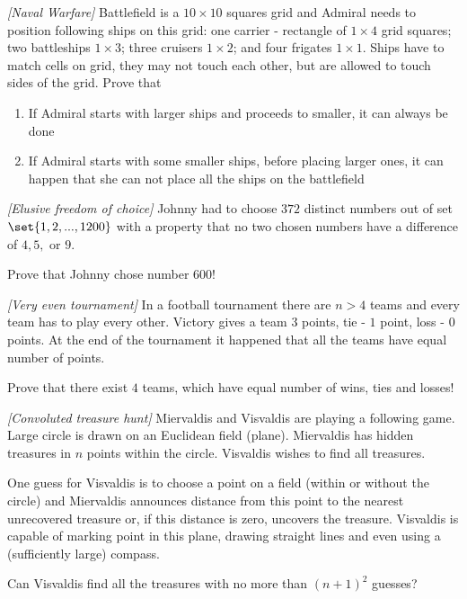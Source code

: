 



\renewcommand{\theenumi}{\alph{enumi}}



\noindent 

\begin{problem}
\textit{[Naval Warfare]}
Battlefield is a $10 \times 10$ squares grid and Admiral needs to position following ships on this grid: one carrier - rectangle of $1 \times 4$ grid squares; two battleships $1\times3$; three cruisers $1\times2$; and four frigates $1\times1$. Ships have to match cells on grid, they may not touch each other, but are allowed to touch sides of the grid. Prove that
\begin{enumerate}
\item If Admiral starts with larger ships and proceeds to smaller, it can always be done
\item If Admiral starts with some smaller ships, before placing larger ones, it can happen that she can not place all the ships on the battlefield
\end{enumerate}
\end{problem}
%

\begin{problem}
\textit{[Elusive freedom of choice]}
Johnny had to choose $372$ distinct numbers out of set $\set{1,2,...,1200}$ with a property that no two chosen numbers have a difference of $4,5,$ or $9$. 

Prove that Johnny chose number $600$! 
\end{problem}
%

\begin{problem}
\textit{[Very even tournament]}
In a football tournament there are $n>4$ teams and every team has to play every other. Victory gives a team $3$ points, tie - $1$ point, loss - $0$ points. At the end of the tournament it happened that all the teams have equal number of points. 

Prove that there exist $4$ teams, which have equal number of wins, ties and losses!
\end{problem}
%

\begin{problem}
\textit{[Convoluted treasure hunt]}
Miervaldis and Visvaldis are playing a following game. Large circle is drawn on an Euclidean field (plane). Miervaldis has hidden treasures in $n$ points within the circle. Visvaldis wishes to find all treasures.

One guess for Visvaldis is to choose a point on a field (within or without the circle) and Miervaldis announces distance from this point to the nearest unrecovered treasure or, if this distance is zero, uncovers the treasure. Visvaldis is capable of marking point in this plane, drawing straight lines and even using a (sufficiently large) compass.

Can Visvaldis find all the treasures with no more than $(n+1)^2$ guesses? 
\end{problem}
%

